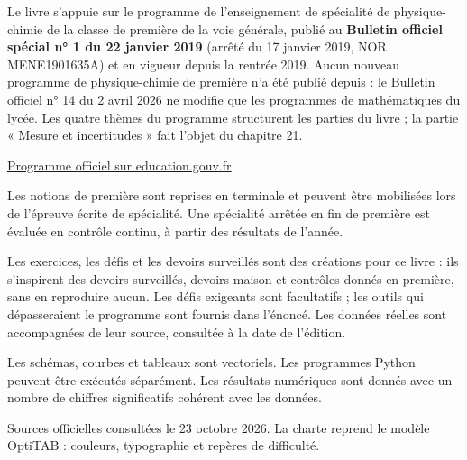 \thispagestyle{otFront}
\label{references}
\fontsize{10.5}{14.5}\selectfont
{}
Le livre s'appuie sur le programme de l'enseignement de spécialité de physique-chimie de la
classe de première de la voie générale, publié au \textbf{Bulletin officiel spécial n° 1 du
22 janvier 2019} (arrêté du 17 janvier 2019, NOR MENE1901635A) et en vigueur depuis la rentrée
2019. Aucun nouveau programme de physique-chimie de première n'a été publié depuis : le
Bulletin officiel n° 14 du 2 avril 2026 ne modifie que les programmes de mathématiques du lycée.
Les quatre thèmes du programme structurent les parties du livre ; la partie « Mesure et
incertitudes » fait l'objet du chapitre 21.\par\vspace{3mm}
\href{https://www.education.gouv.fr/bo/19/Special1/MENE1901635A.htm}{\textcolor{otNavy}{Programme officiel sur education.gouv.fr}}\par\vspace{5mm}
Les notions de première sont reprises en terminale et peuvent être mobilisées lors de l'épreuve
écrite de spécialité. Une spécialité arrêtée en fin de première est évaluée en contrôle continu,
à partir des résultats de l'année.\par\vspace{5mm}
Les exercices, les défis et les devoirs surveillés sont des créations pour ce livre : ils
s'inspirent des devoirs surveillés, devoirs maison et contrôles donnés en première, sans en
reproduire aucun. Les défis exigeants sont facultatifs ; les outils qui dépasseraient le
programme sont fournis dans l'énoncé. Les données réelles sont accompagnées de leur source,
consultée à la date de l'édition.\par\vspace{3mm}
Les schémas, courbes et tableaux sont vectoriels. Les programmes Python peuvent être exécutés
séparément. Les résultats numériques sont donnés avec un nombre de chiffres significatifs
cohérent avec les données.\par\vspace{5mm}
{\fontsize{9}{12}\selectfont\color{otMuted}Sources officielles consultées le 23 octobre 2026.
La charte reprend le modèle OptiTAB : couleurs, typographie et repères de difficulté.}
\clearpage
